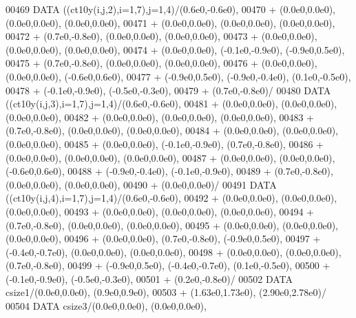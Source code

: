 \begin{DoxyCode}
00469       \textcolor{keyword}{DATA}              ((ct10y(i,j,2),i=1,7),j=1,4)/(0.6e0,-0.6e0),
00470      +                  (0.0e0,0.0e0), (0.0e0,0.0e0), (0.0e0,0.0e0),
00471      +                  (0.0e0,0.0e0), (0.0e0,0.0e0), (0.0e0,0.0e0),
00472      +                  (0.7e0,-0.8e0), (0.0e0,0.0e0), (0.0e0,0.0e0),
00473      +                  (0.0e0,0.0e0), (0.0e0,0.0e0), (0.0e0,0.0e0),
00474      +                  (0.0e0,0.0e0), (-0.1e0,-0.9e0), (-0.9e0,0.5e0),
00475      +                  (0.7e0,-0.8e0), (0.0e0,0.0e0), (0.0e0,0.0e0),
00476      +                  (0.0e0,0.0e0), (0.0e0,0.0e0), (-0.6e0,0.6e0),
00477      +                  (-0.9e0,0.5e0), (-0.9e0,-0.4e0), (0.1e0,-0.5e0),
00478      +                  (-0.1e0,-0.9e0), (-0.5e0,-0.3e0),
00479      +                  (0.7e0,-0.8e0)/
00480       \textcolor{keyword}{DATA}              ((ct10y(i,j,3),i=1,7),j=1,4)/(0.6e0,-0.6e0),
00481      +                  (0.0e0,0.0e0), (0.0e0,0.0e0), (0.0e0,0.0e0),
00482      +                  (0.0e0,0.0e0), (0.0e0,0.0e0), (0.0e0,0.0e0),
00483      +                  (0.7e0,-0.8e0), (0.0e0,0.0e0), (0.0e0,0.0e0),
00484      +                  (0.0e0,0.0e0), (0.0e0,0.0e0), (0.0e0,0.0e0),
00485      +                  (0.0e0,0.0e0), (-0.1e0,-0.9e0), (0.7e0,-0.8e0),
00486      +                  (0.0e0,0.0e0), (0.0e0,0.0e0), (0.0e0,0.0e0),
00487      +                  (0.0e0,0.0e0), (0.0e0,0.0e0), (-0.6e0,0.6e0),
00488      +                  (-0.9e0,-0.4e0), (-0.1e0,-0.9e0),
00489      +                  (0.7e0,-0.8e0), (0.0e0,0.0e0), (0.0e0,0.0e0),
00490      +                  (0.0e0,0.0e0)/
00491       \textcolor{keyword}{DATA}              ((ct10y(i,j,4),i=1,7),j=1,4)/(0.6e0,-0.6e0),
00492      +                  (0.0e0,0.0e0), (0.0e0,0.0e0), (0.0e0,0.0e0),
00493      +                  (0.0e0,0.0e0), (0.0e0,0.0e0), (0.0e0,0.0e0),
00494      +                  (0.7e0,-0.8e0), (0.0e0,0.0e0), (0.0e0,0.0e0),
00495      +                  (0.0e0,0.0e0), (0.0e0,0.0e0), (0.0e0,0.0e0),
00496      +                  (0.0e0,0.0e0), (0.7e0,-0.8e0), (-0.9e0,0.5e0),
00497      +                  (-0.4e0,-0.7e0), (0.0e0,0.0e0), (0.0e0,0.0e0),
00498      +                  (0.0e0,0.0e0), (0.0e0,0.0e0), (0.7e0,-0.8e0),
00499      +                  (-0.9e0,0.5e0), (-0.4e0,-0.7e0), (0.1e0,-0.5e0),
00500      +                  (-0.1e0,-0.9e0), (-0.5e0,-0.3e0),
00501      +                  (0.2e0,-0.8e0)/
00502       \textcolor{keyword}{DATA}              csize1/(0.0e0,0.0e0), (0.9e0,0.9e0),
00503      +                  (1.63e0,1.73e0), (2.90e0,2.78e0)/
00504       \textcolor{keyword}{DATA}              csize3/(0.0e0,0.0e0), (0.0e0,0.0e0),

\end{DoxyCode}
